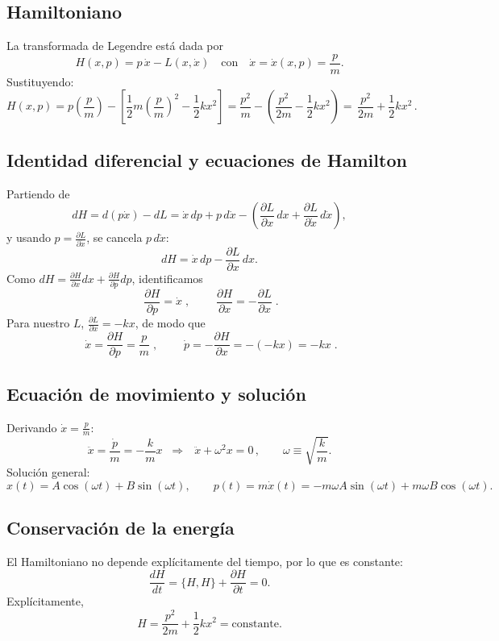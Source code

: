 \documentclass{article}
\begin{document}
\subsection*{Hamiltoniano}
La transformada de Legendre está dada por
\[
H(x,p)=p\,\dot{x}-L(x,\dot{x})\quad\text{con}\quad \dot{x}=\dot{x}(x,p)=\frac{p}{m}.
\]
Sustituyendo:
\[
H(x,p)=p\left(\frac{p}{m}\right)-\left[\frac{1}{2}m\left(\frac{p}{m}\right)^{2}-\frac{1}{2}k x^{2}\right]
=\frac{p^{2}}{m}-\left(\frac{p^{2}}{2m}-\frac{1}{2}k x^{2}\right)
=\boxed{\,\frac{p^{2}}{2m}+\frac{1}{2}k x^{2}\,}.
\]

\subsection*{Identidad diferencial y ecuaciones de Hamilton}
Partiendo de
\[
dH=d(p\dot{x})-dL=\dot{x}\,dp+p\,d\dot{x}-
\left(\frac{\partial L}{\partial x}\,dx+\frac{\partial L}{\partial \dot{x}}\,d\dot{x}\right),
\]
y usando \(p=\frac{\partial L}{\partial \dot{x}}\), se cancela \(p\,d\dot{x}\):
\[
dH=\dot{x}\,dp-\frac{\partial L}{\partial x}\,dx.
\]
Como \(dH=\frac{\partial H}{\partial x}dx+\frac{\partial H}{\partial p}dp\), identificamos
\[
\boxed{\;\frac{\partial H}{\partial p}=\dot{x}\;},\qquad
\boxed{\;\frac{\partial H}{\partial x}=-\frac{\partial L}{\partial x}\;}.
\]
Para nuestro \(L\), \(\frac{\partial L}{\partial x}=-kx\), de modo que
\[
\boxed{\;\dot{x}=\frac{\partial H}{\partial p}=\frac{p}{m}\;},\qquad
\boxed{\;\dot{p}=-\frac{\partial H}{\partial x}=-(-kx)=-kx\;}.
\]

\subsection*{Ecuación de movimiento y solución}
Derivando \(\dot{x}=\frac{p}{m}\):
\[
\ddot{x}=\frac{\dot{p}}{m}=-\frac{k}{m}x \;\;\Rightarrow\;\;
\boxed{\,\ddot{x}+\omega^{2}x=0\,},\qquad \omega\equiv\sqrt{\frac{k}{m}}.
\]
Solución general:
\[
x(t)=A\cos(\omega t)+B\sin(\omega t),\qquad
p(t)=m\dot{x}(t)=-m\omega A\sin(\omega t)+m\omega B\cos(\omega t).
\]

\subsection*{Conservación de la energía}
El Hamiltoniano no depende explícitamente del tiempo, por lo que es constante:
\[
\frac{dH}{dt}=\{H,H\}+\frac{\partial H}{\partial t}=0.
\]
Explícitamente,
\[
H=\frac{p^{2}}{2m}+\frac{1}{2}k x^{2}=\text{constante}.
\]
\end{document}
